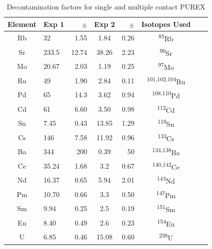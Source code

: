 \documentclass[review]{elsarticle}
\newcommand{\tss}{\textsuperscript}
\begin{document}
\begin{table}[ht]
\caption{Decontamination factors for single and multiple contact PUREX}
\label{tab:DF}
\centering
\begin{tabular}{rlrrrrrl}
  \hline
 \multicolumn{1}{|c|}{Element} & Exp 1 & $\pm$ & \multicolumn{1}{|c}{Exp 2} & $\pm$ & \multicolumn{1}{|c|}{Isotopes Used} \\ 
  \hline
  \multicolumn{1}{|c|}{Rb}  & 32     & 1.55   & \multicolumn{1}{|c}{1.84 } & 0.26  & \multicolumn{1}{|c|}{\tss{85}Rb} \\ 
  \multicolumn{1}{|c|}{Sr}  & 233.5  & 12.74  & \multicolumn{1}{|c}{38.26} & 2.23  & \multicolumn{1}{|c|}{\tss{90}Sr}\\ 
  \multicolumn{1}{|c|}{Mo}  & 20.67  & 2.03   & \multicolumn{1}{|c}{1.19 } & 0.25  & \multicolumn{1}{|c|}{\tss{97}Mo}\\ 
  \multicolumn{1}{|c|}{Ru}  & 49     & 1.90   & \multicolumn{1}{|c}{2.84 } & 0.11  & \multicolumn{1}{|c|}{\tss{101,102,104}Ru} \\ 
  \multicolumn{1}{|c|}{Pd}  & 65     & 14.3   & \multicolumn{1}{|c}{3.62 } & 0.94  & \multicolumn{1}{|c|}{\tss{108,110}Pd} \\ 
  \multicolumn{1}{|c|}{Cd}  & 61     & 6.60   & \multicolumn{1}{|c}{3.50 } & 0.98  & \multicolumn{1}{|c|}{\tss{112}Cd}\\ 
  \multicolumn{1}{|c|}{Sn}  & 7.45   & 0.43   & \multicolumn{1}{|c}{13.85} & 1.29  & \multicolumn{1}{|c|}{\tss{119}Sn}\\ 
  \multicolumn{1}{|c|}{Cs}  & 146    & 7.58   & \multicolumn{1}{|c}{11.92} & 0.96  & \multicolumn{1}{|c|}{\tss{133}Cs}\\ 
  \multicolumn{1}{|c|}{Ba}  & 344    & 200    & \multicolumn{1}{|c}{0.39 } & 50    & \multicolumn{1}{|c|}{\tss{134,138}Ba}\\ 
  \multicolumn{1}{|c|}{Ce}  & 35.24  & 1.68   & \multicolumn{1}{|c}{3.2  } & 0.67  & \multicolumn{1}{|c|}{\tss{140,142}Ce}\\ 
  \multicolumn{1}{|c|}{Nd}  & 16.37  & 0.65   & \multicolumn{1}{|c}{5.94 } & 2.01  & \multicolumn{1}{|c|}{\tss{143}Nd} \\ 
  \multicolumn{1}{|c|}{Pm}  & 10.70  & 0.66   & \multicolumn{1}{|c}{3.3  } & 0.50  & \multicolumn{1}{|c|}{\tss{147}Pm}\\ 
  \multicolumn{1}{|c|}{Sm}  & 9.94   & 0.25   & \multicolumn{1}{|c}{2.5  } & 0.19  & \multicolumn{1}{|c|}{\tss{151}Sm}\\ 
  \multicolumn{1}{|c|}{Eu}  & 8.40   & 0.49   & \multicolumn{1}{|c}{2.6  } & 0.23  & \multicolumn{1}{|c|}{\tss{154}Eu}\\ 
  \multicolumn{1}{|c|}{U }  & 6.85   & 0.46   & \multicolumn{1}{|c}{15.08} & 0.60  & \multicolumn{1}{|c|}{\tss{238}U}\\ 
   \hline
\end{tabular}
\end{table}
\end{document}
